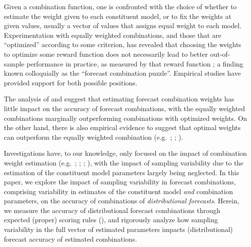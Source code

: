 \documentclass[12pt]{article}
\theoremstyle{definition}
\theoremstyle{remark}
\begin{document}
Given a combination function, one is confronted with the choice of whether to estimate the weight given to each constituent model, or to fix the weights at given values, usually a vector of values that assigns equal weight to each model. Experimentation with equally weighted combinations, and those that are ``optimized'' according to some criterion, has revealed that choosing the weights to optimize some reward function does not necessarily lead to better out-of-sample performance in practice, as measured by that reward function \citep{Clemen1989}; a finding known colloquially as the ``forecast combination puzzle''. Empirical studies have provided support for both {possible }positions. {The analysis of \cite{Stock2004} and \cite{Smith2009} suggest that estimating forecast combination weights has little impact on the accuracy of forecast combinations, with the equally weighted combinations marginally outperforming combinations with optimized weights. On the other hand, there is also empirical evidence to suggest that optimal weights can outperform the equally weighted combination (e.g.\ \citealp{Genre2013}; \citealp{Hsiao2014}; \citealp{Martin2021}).

Investigations have, to our knowledge, only focused on the impact of combination weight estimation (e.g.\ \citealp{Smith2009}; \citealp{Claeskens2016}; \citealp{Elliott2017}; \citealp{Chan2018}), with the impact of sampling variability due to the estimation of the constituent model parameters largely being neglected. In this paper, we explore the impact of sampling variability in forecast combinations, comprising variability in estimates of the constituent model \textit{and} combination parameters, on the accuracy of combinations of \textit{distributional forecasts}. Herein, we measure the accuracy of distributional forecast combinations through expected (proper) scoring rules (\citealp{Gneiting2007}), and rigorously analyze how sampling variability in the full vector of estimated parameters impacts (distributional) forecast accuracy of estimated combinations.

}
\end{document}
